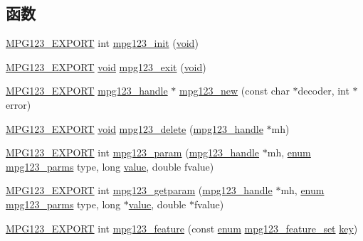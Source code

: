 \subsection*{函数}
\begin{DoxyCompactItemize}
\item 
\hyperlink{mpg123_8h_a2ba98cfba3f760879df70e755b2a61cc}{M\+P\+G123\+\_\+\+E\+X\+P\+O\+RT} int \hyperlink{group__mpg123__init_gad59b5dc08fb7551ef5ec085906a85604}{mpg123\+\_\+init} (\hyperlink{interfacevoid}{void})
\item 
\hyperlink{mpg123_8h_a2ba98cfba3f760879df70e755b2a61cc}{M\+P\+G123\+\_\+\+E\+X\+P\+O\+RT} \hyperlink{interfacevoid}{void} \hyperlink{group__mpg123__init_gac73c78104d6525100aa4e1c62705c6be}{mpg123\+\_\+exit} (\hyperlink{interfacevoid}{void})
\item 
\hyperlink{mpg123_8h_a2ba98cfba3f760879df70e755b2a61cc}{M\+P\+G123\+\_\+\+E\+X\+P\+O\+RT} \hyperlink{group__mpg123__init_ga6728e2839a395f3a07d4514da659faca}{mpg123\+\_\+handle} $\ast$ \hyperlink{group__mpg123__init_ga1413635a4b699acdf3b19bd9d2257557}{mpg123\+\_\+new} (const char $\ast$decoder, int $\ast$error)
\item 
\hyperlink{mpg123_8h_a2ba98cfba3f760879df70e755b2a61cc}{M\+P\+G123\+\_\+\+E\+X\+P\+O\+RT} \hyperlink{interfacevoid}{void} \hyperlink{group__mpg123__init_ga1607278690c3dea7affb906615af12ad}{mpg123\+\_\+delete} (\hyperlink{group__mpg123__init_ga6728e2839a395f3a07d4514da659faca}{mpg123\+\_\+handle} $\ast$mh)
\item 
\hyperlink{mpg123_8h_a2ba98cfba3f760879df70e755b2a61cc}{M\+P\+G123\+\_\+\+E\+X\+P\+O\+RT} int \hyperlink{group__mpg123__init_gad2c81c9b8abeccd5e0e8a01e6744d806}{mpg123\+\_\+param} (\hyperlink{group__mpg123__init_ga6728e2839a395f3a07d4514da659faca}{mpg123\+\_\+handle} $\ast$mh, \hyperlink{interfaceenum}{enum} \hyperlink{group__mpg123__init_ga73a8ff3363028b89afc72b3ea032b9cb}{mpg123\+\_\+parms} type, long \hyperlink{unionvalue}{value}, double fvalue)
\item 
\hyperlink{mpg123_8h_a2ba98cfba3f760879df70e755b2a61cc}{M\+P\+G123\+\_\+\+E\+X\+P\+O\+RT} int \hyperlink{group__mpg123__init_ga2b742bb1eecc9d29a09aa9a7f69b52af}{mpg123\+\_\+getparam} (\hyperlink{group__mpg123__init_ga6728e2839a395f3a07d4514da659faca}{mpg123\+\_\+handle} $\ast$mh, \hyperlink{interfaceenum}{enum} \hyperlink{group__mpg123__init_ga73a8ff3363028b89afc72b3ea032b9cb}{mpg123\+\_\+parms} type, long $\ast$\hyperlink{unionvalue}{value}, double $\ast$fvalue)
\item 
\hyperlink{mpg123_8h_a2ba98cfba3f760879df70e755b2a61cc}{M\+P\+G123\+\_\+\+E\+X\+P\+O\+RT} int \hyperlink{group__mpg123__init_gaf9b00e4fc7273c0d5e41d6d490606d56}{mpg123\+\_\+feature} (const \hyperlink{interfaceenum}{enum} \hyperlink{group__mpg123__init_gab26f1b8c3289847f5928176a20b4c942}{mpg123\+\_\+feature\+\_\+set} \hyperlink{structkey}{key})
\end{DoxyCompactItemize}


